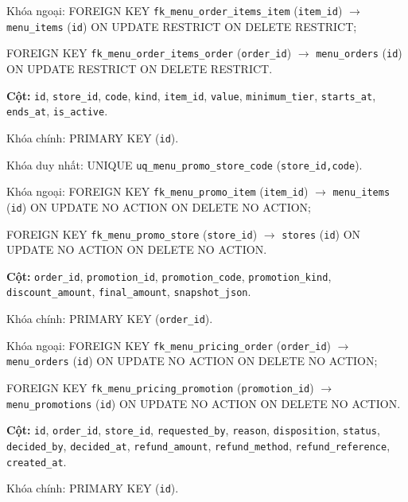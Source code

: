 \begin{description}[leftmargin=3.6cm,labelwidth=3.4cm,style=nextline]
Khóa ngoại: FOREIGN KEY \texttt{fk\_menu\_order\_items\_item} (\texttt{item\_id}) $\rightarrow$ \texttt{menu\_items} (\texttt{id}) ON UPDATE RESTRICT ON DELETE RESTRICT;\par FOREIGN KEY \texttt{fk\_menu\_order\_items\_order} (\texttt{order\_id}) $\rightarrow$ \texttt{menu\_orders} (\texttt{id}) ON UPDATE RESTRICT ON DELETE RESTRICT.

\item[\texttt{menu\_promotions}] \textbf{Cột:} \texttt{id}, \texttt{store\_id}, \texttt{code}, \texttt{kind}, \texttt{item\_id}, \texttt{value}, \texttt{minimum\_tier}, \texttt{starts\_at}, \texttt{ends\_at}, \texttt{is\_active}.

Khóa chính: PRIMARY KEY (\texttt{id}).

Khóa duy nhất: UNIQUE \texttt{uq\_menu\_promo\_store\_code} (\texttt{store\_id,code}).

Khóa ngoại: FOREIGN KEY \texttt{fk\_menu\_promo\_item} (\texttt{item\_id}) $\rightarrow$ \texttt{menu\_items} (\texttt{id}) ON UPDATE NO ACTION ON DELETE NO ACTION;\par FOREIGN KEY \texttt{fk\_menu\_promo\_store} (\texttt{store\_id}) $\rightarrow$ \texttt{stores} (\texttt{id}) ON UPDATE NO ACTION ON DELETE NO ACTION.

\item[\texttt{menu\_order\_pricing}] \textbf{Cột:} \texttt{order\_id}, \texttt{promotion\_id}, \texttt{promotion\_code}, \texttt{promotion\_kind}, \texttt{discount\_amount}, \texttt{final\_amount}, \texttt{snapshot\_json}.

Khóa chính: PRIMARY KEY (\texttt{order\_id}).

Khóa ngoại: FOREIGN KEY \texttt{fk\_menu\_pricing\_order} (\texttt{order\_id}) $\rightarrow$ \texttt{menu\_orders} (\texttt{id}) ON UPDATE NO ACTION ON DELETE NO ACTION;\par FOREIGN KEY \texttt{fk\_menu\_pricing\_promotion} (\texttt{promotion\_id}) $\rightarrow$ \texttt{menu\_promotions} (\texttt{id}) ON UPDATE NO ACTION ON DELETE NO ACTION.

\item[\texttt{pos\_order\_reversals}] \textbf{Cột:} \texttt{id}, \texttt{order\_id}, \texttt{store\_id}, \texttt{requested\_by}, \texttt{reason}, \texttt{disposition}, \texttt{status}, \texttt{decided\_by}, \texttt{decided\_at}, \texttt{refund\_amount}, \texttt{refund\_method}, \texttt{refund\_reference}, \texttt{created\_at}.

Khóa chính: PRIMARY KEY (\texttt{id}).


\end{description}
